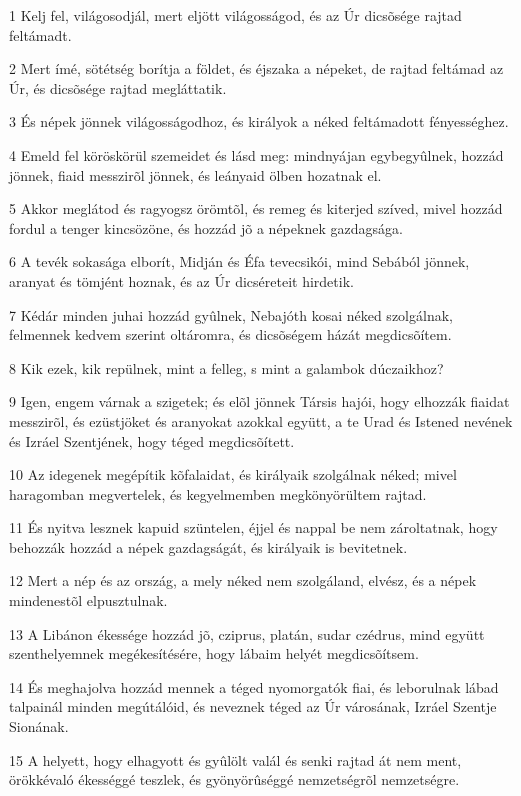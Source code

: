 \par 1 Kelj fel, világosodjál, mert eljött világosságod, és az Úr dicsõsége rajtad feltámadt.
\par 2 Mert ímé, sötétség borítja a földet, és éjszaka a népeket, de rajtad feltámad az Úr, és dicsõsége rajtad megláttatik.
\par 3 És népek jönnek világosságodhoz, és királyok a néked feltámadott fényességhez.
\par 4 Emeld fel köröskörül szemeidet és lásd meg: mindnyájan egybegyûlnek, hozzád jönnek, fiaid messzirõl jönnek, és leányaid ölben hozatnak el.
\par 5 Akkor meglátod és ragyogsz örömtõl, és remeg és kiterjed szíved, mivel hozzád fordul a tenger kincsözöne, és hozzád jõ a népeknek gazdagsága.
\par 6 A tevék sokasága elborít, Midján és Éfa tevecsikói, mind Sebából jönnek, aranyat és tömjént hoznak, és az Úr dicséreteit hirdetik.
\par 7 Kédár minden juhai hozzád gyûlnek, Nebajóth kosai néked szolgálnak, felmennek kedvem szerint oltáromra, és dicsõségem házát megdicsõítem.
\par 8 Kik ezek, kik repülnek, mint a felleg, s mint a galambok dúczaikhoz?
\par 9 Igen, engem várnak a szigetek; és elõl jönnek Társis hajói, hogy elhozzák fiaidat messzirõl, és ezüstjöket és aranyokat azokkal együtt, a te Urad és Istened nevének és Izráel Szentjének, hogy téged megdicsõített.
\par 10 Az idegenek megépítik kõfalaidat, és királyaik szolgálnak néked; mivel haragomban megvertelek, és kegyelmemben megkönyörültem rajtad.
\par 11 És nyitva lesznek kapuid szüntelen, éjjel és nappal be nem zároltatnak, hogy behozzák hozzád a népek gazdagságát, és királyaik is bevitetnek.
\par 12 Mert a nép és az ország, a mely néked nem szolgáland, elvész, és a népek mindenestõl elpusztulnak.
\par 13 A Libánon ékessége hozzád jõ, cziprus, platán, sudar czédrus, mind együtt szenthelyemnek megékesítésére, hogy lábaim helyét megdicsõítsem.
\par 14 És meghajolva hozzád mennek a téged nyomorgatók fiai, és leborulnak lábad talpainál minden megútálóid, és neveznek téged az Úr városának, Izráel Szentje Sionának.
\par 15 A helyett, hogy elhagyott és gyûlölt valál és senki rajtad át nem ment, örökkévaló ékességgé teszlek, és gyönyörûséggé nemzetségrõl nemzetségre.
